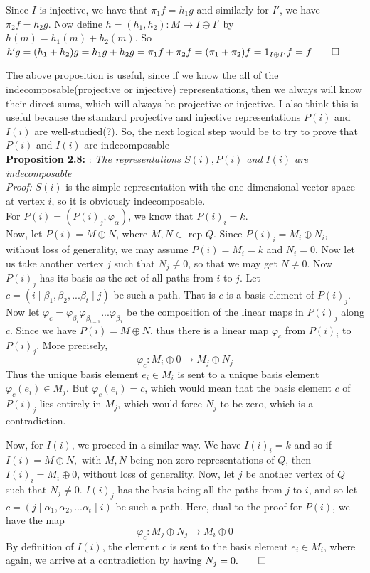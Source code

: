 \documentclass[12pt]{article}
\begin{document}
\begin{enumerate}
Since $I$ is injective, we have that $\pi_1f=h_1g$ and similarly for $I'$, we have $\pi_2f=h_2g$. Now define $h=(h_1,h_2) : M \to I \oplus I'$ by $h(m)=h_1(m)+h_2(m)$. So $h'g=(h_1+h_2)g=h_1g+h_2g=\pi_1f+\pi_2f=(\pi_1+\pi_2)f=1_{I \oplus I'}f=f \qed$

The above proposition is useful, since if we know the all of the indecomposable(projective or injective) representations, then we always will know their direct sums, which will always be projective or injective. I also think this is useful because the standard projective and injective representations $P(i)$ and $I(i)$ are well-studied(?). So, the next logical step would be to try to prove that $P(i)$ and $I(i)$ are indecomposable \\


\textbf{Proposition 2.8: }: \textit{The representations $S(i),P(i)$ and $I(i)$ are indecomposable}\\
\textit{Proof: } $S(i)$ is the simple representation with the one-dimensional vector space at vertex $i$, so it is obviously indecomposable.\\
For $P(i)=(P(i)_j, \varphi_\alpha)$, we know that $P(i)_i=k$.\\
Now, let $P(i)=M \oplus N$, where $M,N \in$ rep $Q$. Since $P(i)_i=M_i\oplus N_i$, without loss of generality, we may assume $P(i)=M_i=k$ and $N_i=0$. Now let us take another vertex $j$ such that $N_j \neq 0$, so that we may get $N\neq 0$. Now $P(i)_j$ has its basis as the set of all paths from $i$ to $j$. Let $c=(i\mid\beta_1,\beta_2,...\beta_t \mid j)$ be such a path. That is $c$ is a basis element of $P(i)_j$. Now let $\varphi_c=\varphi_{\beta_t}\varphi_{\beta_{t-1}}...\varphi_{\beta_1}$ be the composition of the linear maps in $P(i)_j$ along $c$. Since we have $P(i)=M \oplus N$, thus there is a linear map $\varphi_c$ from $P(i)_i$ to $P(i)_j$. More precisely,
\[
\varphi_c:M_i\oplus 0 \to M_j \oplus N_j
\]
Thus the unique basis element $e_i \in M_i$ is sent to a unique basis element $\varphi_c(e_i)\in M_j$. But $\varphi_c(e_i)=c$, which
would mean that the basis element $c$ of $P(i)_j$ lies entirely in $M_j$, which would force $N_j$ to be zero, which is a contradiction.

Now, for $I(i)$, we proceed in a similar way. We have $I(i)_i=k$ and so if $I(i)=M\oplus N,$ with $M,N$ being non-zero representations of $Q$, then $I(i)_i=M_i \oplus 0$, without loss of generality. Now, let $j$ be another vertex of $Q$ such that $N_j \neq 0$. $I(i)_j$ has the basis being all the paths from $j$ to $i$, and so let $c=(j\mid \alpha_1, \alpha_2,...\alpha_t\mid i)$ be such a path. Here, dual to the proof for $P(i)$, we have the map 
\[
\varphi_c:M_j \oplus N_j \to M_i \oplus 0
\]
By definition of $I(i)$, the element $c$ is sent to the basis element $e_i \in M_i$, where again, we arrive at a contradiction by having $N_j=0. \qed$\\



\end{enumerate}
\end{document}
